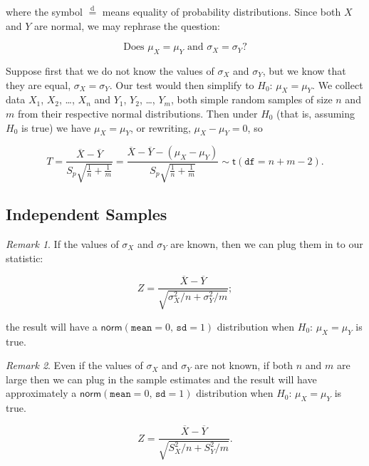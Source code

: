 \documentclass[]{book}
\numberwithin{equation}{chapter}
\numberwithin{figure}{chapter}
\theoremstyle{plain}
\theoremstyle{definition}
\theoremstyle{remark}
\theoremstyle{definition}
\theoremstyle{definition}
\theoremstyle{remark}
\newtheorem*{remark}{Remark}
\begin{document}
where the symbol \(\overset{\mathrm{d}}{=}\) means equality of
probability distributions. Since both \(X\) and \(Y\) are normal, we may
rephrase the question:

\begin{equation}
\mbox{Does }\mu_{X} = \mu_{Y}\mbox{ and }\sigma_{X} = \sigma_{Y}?
\end{equation}

Suppose first that we do not know the values of \(\sigma_{X}\) and
\(\sigma_{Y}\), but we know that they are equal,
\(\sigma_{X}=\sigma_{Y}\). Our test would then simplify to
\(H_{0}:\,\mu_{X} = \mu_{Y}\). We collect data \(X_{1}\), \(X_{2}\),
\ldots{}, \(X_{n}\) and \(Y_{1}\), \(Y_{2}\), \ldots{}, \(Y_{m}\), both
simple random samples of size \(n\) and \(m\) from their respective
normal distributions. Then under \(H_{0}\) (that is, assuming \(H_{0}\)
is true) we have \(\mu_{X} = \mu_{Y}\), or rewriting,
\(\mu_{X} - \mu_{Y} = 0\), so

\begin{equation}
T = \frac{\overline{X} - \overline{Y}}{S_{p}\sqrt{\frac{1}{n} + \frac{1}{m}}} = \frac{\overline{X} - \overline{Y} - (\mu_{X} - \mu_{Y})}{S_{p}\sqrt{\frac{1}{n} + \frac{1}{m}}}\sim\mathsf{t}(\mathtt{df} = n + m - 2).
\end{equation}

\subsection{Independent Samples}\label{independent-samples}

\begin{remark}
If the values of \(\sigma_{X}\) and \(\sigma_{Y}\) are known, then we
can plug them in to our statistic:

\begin{equation} 
Z = \frac{\overline{X} - \overline{Y}}{\sqrt{\sigma_{X}^{2}/n + \sigma_{Y}^{2}/m}};
\end{equation}

the result will have a
\(\mathsf{norm}(\mathtt{mean} = 0,\,\mathtt{sd} = 1)\) distribution when
\(H_{0}:\,\mu_{X} = \mu_{Y}\) is true.
\end{remark}

\begin{remark}
Even if the values of \(\sigma_{X}\) and \(\sigma_{Y}\) are not known,
if both \(n\) and \(m\) are large then we can plug in the sample
estimates and the result will have approximately a
\(\mathsf{norm}(\mathtt{mean} = 0,\,\mathtt{sd} = 1)\) distribution when
\(H_{0}:\,\mu_{X} = \mu_{Y}\) is true.

\begin{equation} 
Z = \frac{\overline{X} - \overline{Y}}{\sqrt{S_{X}^{2}/n + S_{Y}^{2}/m}}.
\end{equation}
\end{remark}
\end{document}
